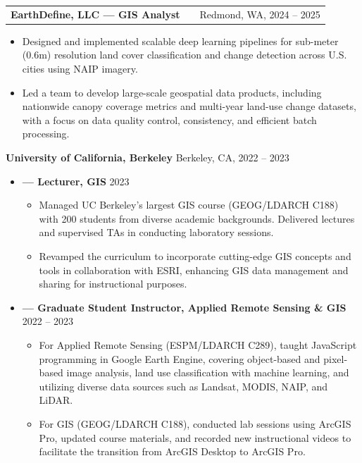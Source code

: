 \documentclass[a4paper,12pt]{article}
\makeatletter
\newenvironment{joblong}[2]
{
\begin{tabularx}{\linewidth}{@{}l X r@{}}
\textbf{#1} & \hfill &  #2 \\[3.75pt]
\end{tabularx}
\begin{minipage}[t]{\linewidth}
\begin{itemize}[nosep,after=\strut,leftmargin=1.2em,itemsep=3pt,label=--]
}
{
\end{itemize}
\end{minipage}
}
\makeatother
\begin{document}
\begin{joblong}{EarthDefine, LLC --- GIS Analyst}{Redmond, WA, 2024 -- 2025}
\item Designed and implemented scalable deep learning pipelines for sub-meter (0.6m) resolution land cover classification and change detection across U.S. cities using NAIP imagery.
\item Led a team to develop large-scale geospatial data products, including nationwide canopy coverage metrics and multi-year land-use change datasets, with a focus on data quality control, consistency, and efficient batch processing.
\end{joblong}

\textbf{University of California, Berkeley} \hfill Berkeley, CA, 2022 -- 2023 \\
\vspace{-18pt}

\begin{itemize}[leftmargin=1.5em, label={}]
    \item \textbf{— Lecturer, GIS} \hfill 2023
    \begin{itemize}[nosep, leftmargin=1.2em, label=--]
        \item Managed UC Berkeley's largest GIS course (GEOG/LDARCH C188) with 200 students from diverse academic backgrounds. Delivered lectures and supervised TAs in conducting laboratory sessions.
        \item Revamped the curriculum to incorporate cutting-edge GIS concepts and tools in collaboration with ESRI, enhancing GIS data management and sharing for instructional purposes.
    \end{itemize}
    
    \vspace{3pt}

    \item \textbf{— Graduate Student Instructor, Applied Remote Sensing \& GIS} \hfill 2022 -- 2023
    \begin{itemize}[nosep, leftmargin=1.2em, label=--]
        \item For Applied Remote Sensing (ESPM/LDARCH C289), taught JavaScript programming in Google Earth Engine, covering object-based and pixel-based image analysis, land use classification with machine learning, and utilizing diverse data sources such as Landsat, MODIS, NAIP, and LiDAR.
        \item For GIS (GEOG/LDARCH C188), conducted lab sessions using ArcGIS Pro, updated course materials, and recorded new instructional videos to facilitate the transition from ArcGIS Desktop to ArcGIS Pro.
    \end{itemize}
\end{itemize}
\end{document}
